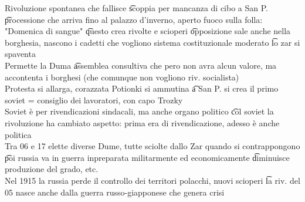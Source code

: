 \documentclass[12pt]{article}
\begin{document}
\sss[1905]
Rivoluzione spontanea che fallisce \t scoppia per mancanza di cibo a San P. \t processione che arriva fino al palazzo d'inverno, aperto fuoco sulla folla: "Domenica di sangue" \t questo crea rivolte e scioperi \t opposizione sale anche nella borghesia, nascono i cadetti che vogliono sistema costituzionale moderato \t lo zar si spaventa \\
Permette la Duma \t assemblea consultiva che pero non avra alcun valore, ma accontenta i borghesi (che comunque non vogliono riv. socialista) \\
Protesta si allarga, corazzata Potionki si ammutina \t a San P. si crea il primo soviet = consiglio dei lavoratori, con capo Trozky \\
Soviet è per rivendicazioni sindacali, ma anche organo politico \t col soviet la rivoluzione ha cambiato aspetto: prima era di rivendicazione, adesso è anche politica \\
Tra 06 e 17 elette diverse Dume, tutte sciolte dallo Zar quando si contrappongono \t poi russia va in guerra inpreparata militarmente ed economicamente \t diminuisce produzione del grado, etc. \\
Nel 1915 la russia perde il controllo dei territori polacchi, nuovi scioperi \t la riv. del 05 nasce anche dalla guerra russo-giapponese che genera crisi
\end{document}
